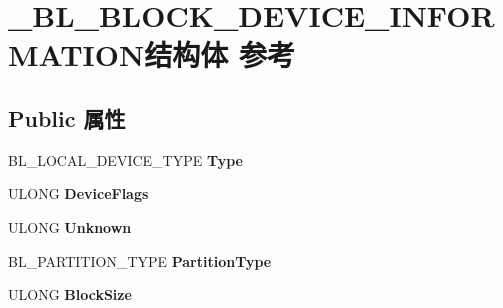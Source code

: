 \hypertarget{struct___b_l___b_l_o_c_k___d_e_v_i_c_e___i_n_f_o_r_m_a_t_i_o_n}{}\section{\+\_\+\+B\+L\+\_\+\+B\+L\+O\+C\+K\+\_\+\+D\+E\+V\+I\+C\+E\+\_\+\+I\+N\+F\+O\+R\+M\+A\+T\+I\+O\+N结构体 参考}
\label{struct___b_l___b_l_o_c_k___d_e_v_i_c_e___i_n_f_o_r_m_a_t_i_o_n}
\subsection*{Public 属性}
\begin{DoxyCompactItemize}
\item 
\mbox{\label{struct___b_l___b_l_o_c_k___d_e_v_i_c_e___i_n_f_o_r_m_a_t_i_o_n_a66c64e39d80bb27363efb8d07069e3f5}} 
B\+L\+\_\+\+L\+O\+C\+A\+L\+\_\+\+D\+E\+V\+I\+C\+E\+\_\+\+T\+Y\+PE {\bfseries Type}
\item 
\mbox{\label{struct___b_l___b_l_o_c_k___d_e_v_i_c_e___i_n_f_o_r_m_a_t_i_o_n_af2b9783ce5bd74a0424249309d1f374c}} 
U\+L\+O\+NG {\bfseries Device\+Flags}
\item 
\mbox{\label{struct___b_l___b_l_o_c_k___d_e_v_i_c_e___i_n_f_o_r_m_a_t_i_o_n_a2688a50123d77f1d0b168492c21d276a}} 
U\+L\+O\+NG {\bfseries Unknown}
\item 
\mbox{\label{struct___b_l___b_l_o_c_k___d_e_v_i_c_e___i_n_f_o_r_m_a_t_i_o_n_ae00c481562c6a4935aa50ea3a194472b}} 
B\+L\+\_\+\+P\+A\+R\+T\+I\+T\+I\+O\+N\+\_\+\+T\+Y\+PE {\bfseries Partition\+Type}
\item 
\mbox{\label{struct___b_l___b_l_o_c_k___d_e_v_i_c_e___i_n_f_o_r_m_a_t_i_o_n_ab1ee015f3a77c312758df7e5788c6581}} 
U\+L\+O\+NG {\bfseries Block\+Size}
\item 
\mbox{\label{struct___b_l___b_l_o_c_k___d_e_v_i_c_e___i_n_f_o_r_m_a_t_i_o_n_a095aec0b3778ec77b2dd61e020621c9d}} 

\end{DoxyCompactItemize}
